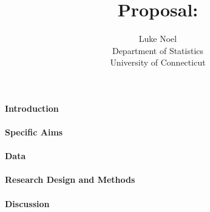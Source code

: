 \documentclass[12pt]{article}
\title{Proposal: }
\author{Luke Noel\\
  Department of Statistics\\
  University of Connecticut
}
\begin{document}
\maketitle


\paragraph{Introduction}


\paragraph{Specific Aims}


\paragraph{Data}


\paragraph{Research Design and Methods}



\paragraph{Discussion}





\end{document}
